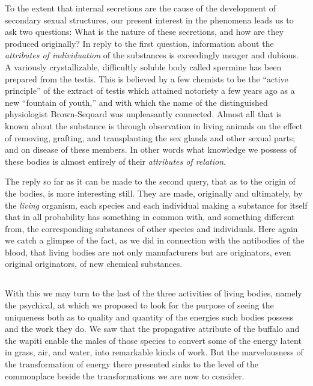 \documentclass[a4paper, 11pt, oneside, polutonikogreek, english]{article}
\begin{document}
To the extent that internal secretions are the cause of the development of secondary sexual structures, our present interest in the phenomena leads us to ask two questions: What is the nature of these secretions, and how are they produced originally? In reply to the first question, information about the \emph{attributes of individuation} of the substances is exceedingly meager and dubious. A variously crystallizable, difficultly soluble body called spermine has been prepared from the testis. This is believed by a few chemists to be the ``active principle'' of the extract of testis which attained notoriety a few years ago as a new ``fountain of youth,'' and with which the name of the distinguished physiologist Brown-Sequard was unpleasantly connected. Almost all that is known about the substance is through observation in living animals on the effect of removing, grafting, and transplanting the sex glands and other sexual parts; and on disease of these members. In other words what knowledge we possess of these bodies is almost entirely of their \emph{attributes of relation}.

The reply so far as it can be made to the second query, that as to the origin of the bodies, is more interesting still. They are made, originally and ultimately, by the \emph{living} organism, each species and each individual making a substance for itself that in all probability has something in common with, and something different from, the corresponding substances of other species and individuals. Here again we catch a glimpse of the fact, as we did in connection with the antibodies of the blood, that living bodies are not only manufacturers but are originators, even original originators, of new chemical substances.

\subsection{}
\paragraph{}
With this we may turn to the last of the three activities of living bodies, namely the psychical, at which we proposed to look for the purpose of seeing the uniqueness both as to quality and quantity of the energies such bodies possess and the work they do. We saw that the propagative attribute of the buffalo and the wapiti enable the males of those species to convert some of the energy latent in grass, air, and water, into remarkable kinds of work. But the marvelousness of the transformation of energy there presented sinks to the level of the commonplace beside the transformations we are now to consider.
\end{document}
